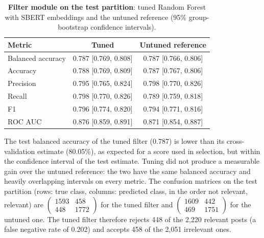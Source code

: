 \begin{table}
    \centering
    \caption{\textbf{Filter module on the test partition}: tuned Random Forest with SBERT embeddings and the untuned reference (95{\%} group-bootstrap confidence intervals).}
    \label{tab:filter-test}
    \small
    \begin{tabular}{lcc}
        \hline
        \textbf{Metric} & \textbf{Tuned} & \textbf{Untuned reference} \\
        \hline
        Balanced accuracy & 0.787 [0.769, 0.808] & 0.787 [0.766, 0.806] \\
        Accuracy & 0.788 [0.769, 0.809] & 0.787 [0.767, 0.806] \\
        Precision & 0.795 [0.765, 0.824] & 0.798 [0.770, 0.826] \\
        Recall & 0.798 [0.770, 0.826] & 0.789 [0.759, 0.818] \\
        F1 & 0.796 [0.774, 0.820] & 0.794 [0.771, 0.816] \\
        ROC AUC & 0.876 [0.859, 0.891] & 0.871 [0.854, 0.887] \\
        \hline
    \end{tabular}
\end{table}

The test balanced accuracy of the tuned filter (0.787) is lower than its cross-validation estimate (80.05{\%}), as expected for a score used in selection, but within the confidence interval of the test estimate. Tuning did not produce a measurable gain over the untuned reference: the two have the same balanced accuracy and heavily overlapping intervals on every metric. The confusion matrices on the test partition (rows: true class, columns: predicted class, in the order not relevant, relevant) are $\begin{pmatrix}1593 & 458\\ 448 & 1772\end{pmatrix}$ for the tuned filter and $\begin{pmatrix}1609 & 442\\ 469 & 1751\end{pmatrix}$ for the untuned one. The tuned filter therefore rejects 448 of the 2,220 relevant posts (a false negative rate of 0.202) and accepts 458 of the 2,051 irrelevant ones.

